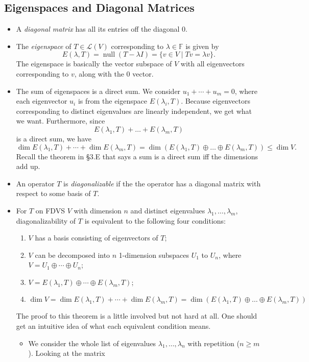 \documentclass{article}
\newcommand{\F}{\mathbb{F}}
\newcommand{\n}{\operatorname{null}}
\renewcommand{\d}{\dim}
\newcommand{\LV}{\mathcal{L}(V)}
\begin{document}
\subsection{Eigenspaces and Diagonal Matrices}
\begin{itemize}
    \item A \textit{diagonal matrix} has all its entries off the diagonal 0.
    \item The \textit{eigenspace} of $T \in \LV$ corresponding to $\lambda \in \F$ is given by $$E(\lambda,T) = \n (T-\lambda I) = \{v \in V \mid Tv = \lambda v\}.$$
    The eigenspace is basically the vector subspace of $V$ with all eigenvectors corresponding to $v$, along with the 0 vector.
    \item The sum of eigenspaces is a direct sum. We consider $u_1+\cdots+u_m = 0$, where each eigenvector $u_i$ is from the eigenspace $E(\lambda_i,T)$. Because eigenvectors corresponding to distinct eigenvalues are linearly independent, we get what we want. Furthermore, since $$E(\lambda_1,T)+\dots+E(\lambda_m,T)$$ is a direct sum, we have $$\d E(\lambda_1,T) + \cdots + \d E(\lambda_m,T) = \d (E(\lambda_1,T) \oplus \dots \oplus E(\lambda_m,T)) \leq \d V.$$ Recall the theorem in \S3.E that says a sum is a direct sum iff the dimensions add up.
    \item An operator $T$ is \textit{diagonalizable} if the the operator has a diagonal matrix with respect to some basis of $T$.
    \item For $T$ on FDVS $V$ with dimension $n$ and distinct eigenvalues $\lambda_1, \dots, \lambda_m$, diagonalizability of $T$ is equivalent to the following four conditions:
    \begin{enumerate}[label=(\alph*)]
        \item $V$ has a basis consisting of eigenvectors of $T$;
        \item $V$ can be decomposed into $n$ 1-dimension subspaces $U_1$ to $U_n$, where $V = U_1 \oplus \cdots \oplus U_n$;
        \item $V = E(\lambda_1,T) \oplus \cdots \oplus E(\lambda_m,T)$;
        \item $\d V = \d E(\lambda_1,T) + \cdots + \d E(\lambda_m,T) = \d (E(\lambda_1,T) \oplus \dots \oplus E(\lambda_m,T))$
    \end{enumerate}
    The proof to this theorem is a little involved but not hard at all. One should get an intuitive idea of what each equivalent condition means.
    \begin{itemize}
    \item We consider the whole list of eigenvalues $\lambda_1, \dots, \lambda_n$ with repetition ($n \geq m$). Looking at the matrix

\end{itemize}
\end{itemize}
\end{document}
